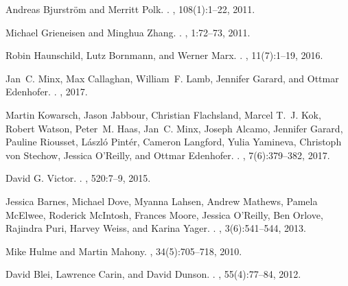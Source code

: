 \documentclass{article}
\begin{document}
\linespread{1}
%
\begin{thebibliography}{10}
	
	Andreas Bjurstr{\"{o}}m and Merritt Polk.
	.
	, 108(1):1--22, 2011.
	
	Michael Grieneisen and Minghua Zhang.
	.
	, 1:72--73, 2011.
	
	Robin Haunschild, Lutz Bornmann, and Werner Marx.
	.
	, 11(7):1--19, 2016.
	
	Jan~C. Minx, Max Callaghan, William~F. Lamb, Jennifer Garard, and Ottmar
	Edenhofer.
	.
	, 2017.
	
	Martin Kowarsch, Jason Jabbour, Christian Flachsland, Marcel T.~J. Kok, Robert
	Watson, Peter~M. Haas, Jan~C. Minx, Joseph Alcamo, Jennifer Garard, Pauline
	Riousset, L{\'{a}}szl{\'{o}} Pint{\'{e}}r, Cameron Langford, Yulia Yamineva,
	Christoph von Stechow, Jessica O'Reilly, and Ottmar Edenhofer.
	.
	, 7(6):379--382, 2017.
	
	{David G. Victor}.
	.
	, 520:7--9, 2015.
	
	Jessica Barnes, Michael Dove, Myanna Lahsen, Andrew Mathews, Pamela McElwee,
	Roderick McIntosh, Frances Moore, Jessica O'Reilly, Ben Orlove, Rajindra
	Puri, Harvey Weiss, and Karina Yager.
	.
	, 3(6):541--544, 2013.
	
	Mike Hulme and Martin Mahony.
	, 34(5):705--718, 2010.
	
	David Blei, Lawrence Carin, and David Dunson.
	.
	, 55(4):77--84, 2012.
	

\end{thebibliography}
\end{document}
